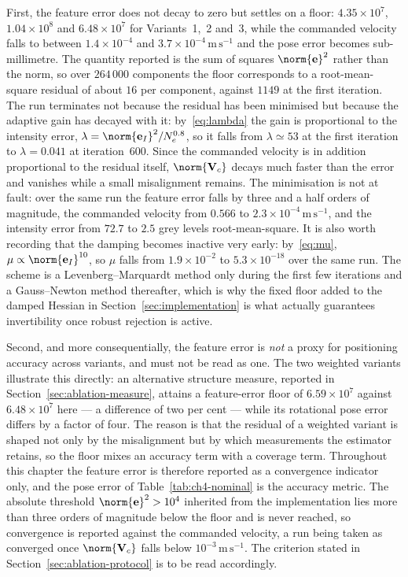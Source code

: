 First, the feature error does not decay to zero but settles on a floor:
$4.35\times10^{7}$, $1.04\times10^{8}$ and $6.48\times10^{7}$ for
Variants~1,~2 and~3, while the commanded velocity falls to between
$1.4\times10^{-4}$ and $3.7\times10^{-4}\,\mathrm{m\,s^{-1}}$ and the pose
error becomes sub-millimetre. The quantity reported is the sum of squares
$\norm{\mathbf{e}}^{2}$ rather than the norm, so over $264\,000$ components the
floor corresponds to a root-mean-square residual of about $16$ per component,
against $1149$ at the first iteration. The run terminates not because the
residual has been minimised but because the adaptive gain has decayed with it:
by~\eqref{eq:lambda} the gain is proportional to the intensity error,
$\lambda=\norm{\mathbf{e}_I}^{2}/N_{e}^{0.8}$, so it falls from
$\lambda\simeq53$ at the first iteration to $\lambda=0.041$ at iteration~600.
Since the commanded velocity is in addition proportional to the residual
itself, $\norm{\mathbf{V}_c}$ decays much faster than the error and vanishes
while a small misalignment remains. The minimisation is not at fault: over the
same run the feature error falls by three and a half orders of magnitude, the
commanded velocity from $0.566$ to $2.3\times10^{-4}\,\mathrm{m\,s^{-1}}$, and
the intensity error from $72.7$ to $2.5$ grey levels root-mean-square. It is
also worth recording that the damping becomes inactive very early:
by~\eqref{eq:mu}, $\mu\propto\norm{\mathbf{e}_I}^{10}$, so $\mu$ falls from
$1.9\times10^{-2}$ to $5.3\times10^{-18}$ over the same run. The scheme is a
Levenberg--Marquardt method only during the first few iterations and a
Gauss--Newton method thereafter, which is why the fixed floor added to the
damped Hessian in Section~\ref{sec:implementation} is what actually guarantees
invertibility once robust rejection is active.

Second, and more consequentially, the feature error is \emph{not} a proxy for
positioning accuracy across variants, and must not be read as one. The two
weighted variants illustrate this directly: an alternative structure measure,
reported in Section~\ref{sec:ablation-measure}, attains a feature-error floor
of $6.59\times10^{7}$ against $6.48\times10^{7}$ here --- a difference of two
per cent --- while its rotational pose error differs by a factor of four. The
reason is that the residual of a weighted variant is shaped not only by the
misalignment but by which measurements the estimator retains, so the floor
mixes an accuracy term with a coverage term. Throughout this chapter the
feature error is therefore reported as a convergence indicator only, and the
pose error of Table~\ref{tab:ch4-nominal} is the accuracy metric. The absolute
threshold $\norm{\mathbf{e}}^{2}>10^{4}$ inherited from the implementation lies
more than three orders of magnitude below the floor and is never reached, so
convergence is reported against the commanded velocity, a run being taken as
converged once $\norm{\mathbf{V}_c}$ falls below
$10^{-3}\,\mathrm{m\,s^{-1}}$. The criterion stated in
Section~\ref{sec:ablation-protocol} is to be read accordingly.

